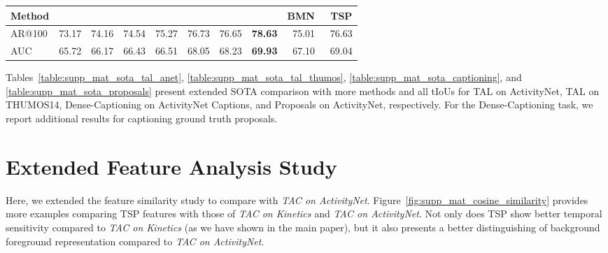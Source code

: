 \documentclass[10pt,twocolumn,letterpaper]{article}
\begin{document}
\begin{table*}[t]
    \small
    \centering
    \tabcolsep=0.1cm
    \caption{\textbf{SOTA comparison for Proposals on ActivityNet (extended results)}. We use BMN atop our features. TSP significantly improves over BMN original performance, and is competitive with SOTA.}
    \begin{tabular}{l|ccccccc|cc}
    \toprule
 Method  & \cite{gao_eccv_2018} & \cite{lin_eccv_2018} & \cite{mgg} & \cite{zhao2020bottom} & \cite{bcgcn} & \cite{dbg} & \cite{gao2020accurate} & BMN~\cite{Lin_2019_ICCV}  &\bf TSP  \\ \midrule
 AR@100  & 73.17                & 74.16                & 74.54      & 75.27                 & 76.73        & 76.65      &\bf78.63                & 75.01                     &   76.63 \\
\rowcolor{Gray}
 AUC & 65.72                & 66.17                & 66.43      & 66.51                 & 68.05        & 68.23      &\bf69.93                & 67.10                     &   69.04 \\
    \bottomrule
    \end{tabular}
    \label{table:supp_mat_sota_proposals}
\end{table*}


 Tables~\ref{table:supp_mat_sota_tal_anet}, \ref{table:supp_mat_sota_tal_thumos}, \ref{table:supp_mat_sota_captioning}, and \ref{table:supp_mat_sota_proposals} present extended SOTA comparison with more methods and all tIoUs for TAL on ActivityNet, TAL on THUMOS14, Dense-Captioning on ActivityNet Captions, and Proposals on ActivityNet, respectively. For the Dense-Captioning task, we report additional results for captioning ground truth proposals.

\section{Extended Feature Analysis Study}

Here, we extended the feature similarity study to compare with \textit{TAC on ActivityNet}. Figure~\ref{fig:supp_mat_cosine_similarity} provides more examples comparing TSP features with those of \textit{TAC on Kinetics} and \textit{TAC on ActivityNet}. Not only does TSP show better temporal sensitivity compared to \textit{TAC on Kinetics} (as we have shown in the main paper), but it also presents a better distinguishing of background \vs foreground representation compared to \textit{TAC on ActivityNet}. 
\end{document}
